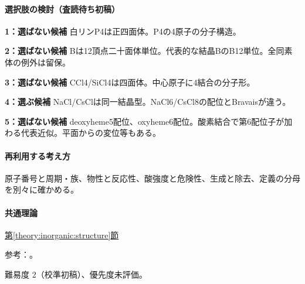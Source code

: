 \paragraph{選択肢の検討（査読待ち初稿）}\mbox{}\par

\noindent\textbf{1：選ばない候補} 白リンP4は正四面体。P4の4原子の分子構造。\par

\noindent\textbf{2：選ばない候補} Bは12頂点二十面体単位。代表的な結晶BのB12単位。全同素体の例外は留保。\par

\noindent\textbf{3：選ばない候補} CCl4/SiCl4は四面体。中心原子に4結合の分子形。\par

\noindent\textbf{4：選ぶ候補} NaCl/CsClは同一結晶型。NaCl6/CsCl8の配位とBravaisが違う。\par

\noindent\textbf{5：選ばない候補} deoxyheme5配位、oxyheme6配位。酸素結合で第6配位子が加わる代表近似。平面からの変位等もある。\par

\paragraph{再利用する考え方} 原子番号と周期・族、物性と反応性、酸強度と危険性、生成と除去、定義の分母を別々に確かめる。

\paragraph{共通理論} \hyperref[theory:inorganic:structure]{第\ref*{theory:inorganic:structure}節}

\par 参考：\cite{openstax_crystals,inorganic_metalloid_ref,inorganic_heme}。

\par 難易度 2（校準初稿）、優先度未評価。
